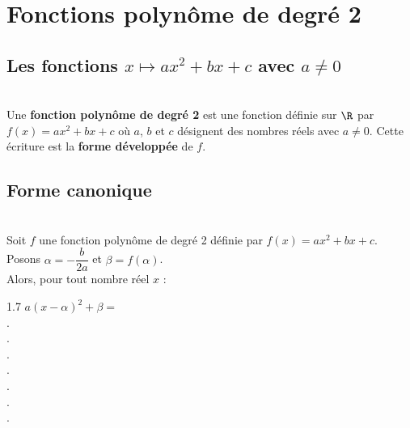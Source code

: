 \documentclass[11 pt, a4paper]{article}
\title{\titre}
\date{}
\author{\classe}
\begin{document}
\renewcommand{\labelitemi}{$\star$}
\maketitle


\normalsize


\section{Fonctions polynôme de degré 2}
	\subsection{Les fonctions $x \mapsto ax^2+bx+c$ avec $a \neq 0$}
\begin{Df} ~\\	
Une \textbf{fonction polynôme de degré 2} est une fonction définie sur $\R$ par $f(x)=ax^2+bx+c$ où $a$, $b$ et $c$ désignent des nombres réels avec $a\neq 0$. Cette écriture est la \textbf{forme développée} de $f$.
\end{Df}	





	\subsection{Forme canonique}

\begin{Dm}~ \\
Soit $f$ une fonction polynôme de degré 2 définie par $f(x)=ax^2+bx+c$.\\
Posons $\alpha=-\dfrac{b}{2a}$ et $\beta = f(\alpha)$.\\
Alors, pour tout nombre réel $x$ : 
\begin{spacing}{1.7}
	$a(x-\alpha)^2+\beta=$ \dotfill \\.\dotfill \\.\dotfill \\.\dotfill \\.\dotfill\\ .\dotfill \\ .\dotfill \\ .\dotfill
\end{spacing}
\end{Dm}
\end{document}
